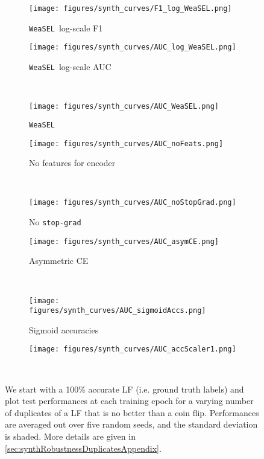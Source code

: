 \documentclass{article}
\newcommand{\weasel}{\texttt{WeaSEL}}\newcommand{\brackets}[1]{\left( #1 \right)}
\begin{document}
\begin{figure}[htb]
\centering
 \begin{subfigure}[b]{.48\linewidth}
    \centering
    \texttt{[image: figures/synth\_curves/F1\_log\_WeaSEL.png]}
    \caption{\weasel\ log-scale F1}\label{fig:logWeaselF1}
    \end{subfigure}\begin{subfigure}[b]{.48\linewidth}
    \centering
    \texttt{[image: figures/synth\_curves/AUC\_log\_WeaSEL.png]}
    \caption{\weasel\ log-scale AUC}\label{fig:logWeaselAUC}
 \end{subfigure} \\
  \begin{subfigure}[b]{.48\linewidth}
    \centering
    \texttt{[image: figures/synth\_curves/AUC\_WeaSEL.png]}
    \caption{\weasel}\label{fig:WeaselAUC}
  \end{subfigure}\begin{subfigure}[b]{.48\linewidth}
    \centering
    \texttt{[image: figures/synth\_curves/AUC\_noFeats.png]}
    \caption{No features for encoder}\label{fig:noFeats}
 \end{subfigure} \\
  \begin{subfigure}[b]{.48\linewidth}
    \centering
    \texttt{[image: figures/synth\_curves/AUC\_noStopGrad.png]}
    \caption{No \texttt{stop-grad}}\label{fig:noStopGrad}
  \end{subfigure}\begin{subfigure}[b]{.48\linewidth}
    \centering
    \texttt{[image: figures/synth\_curves/AUC\_asymCE.png]}
    \caption{Asymmetric CE}\label{fig:asymCE}
 \end{subfigure} \\
  \begin{subfigure}[b]{.48\linewidth}
    \centering
    \texttt{[image: figures/synth\_curves/AUC\_sigmoidAccs.png]}
    \caption{Sigmoid accuracies}\label{fig:SigmoidAccs}
  \end{subfigure}\begin{subfigure}[b]{.48\linewidth}
    \centering
    \texttt{[image: figures/synth\_curves/AUC\_accScaler1.png]}
    \caption{}\label{fig:noScaler}
 \end{subfigure} \\
  \caption{We start with a 100\% accurate LF (i.e. ground truth labels) and plot test performances at each training epoch for a varying number of duplicates  of a LF that is no better than a coin flip. Performances are averaged out over five random seeds, and the standard deviation is shaded. More details are given in \ref{sec:synthRobustnessDuplicatesAppendix}.}
  \label{fig:syntheticRobustnessAppendix}
\end{figure} 



 
\end{document}
